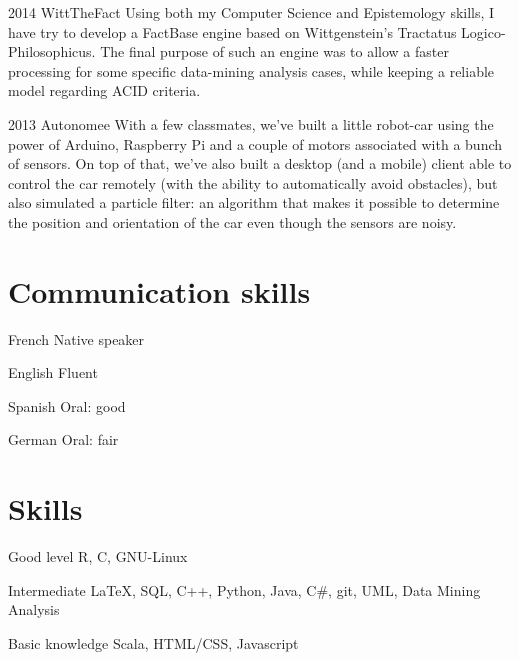 \documentclass[fontsize=10pt]{tccv}
\begin{document}
\begin{list}

\item{2014}
     {WittTheFact}
     {Using both my Computer Science and Epistemology skills, I have try to develop a
     FactBase engine based on Wittgenstein’s Tractatus Logico-Philosophicus.
     The final purpose of such an engine was to allow a faster processing for some specific data-mining analysis cases, while keeping a reliable model regarding ACID criteria.}

\item{2013}
     {Autonomee}
     {With a few classmates, we've built a little robot-car using the power of Arduino, Raspberry Pi and a couple of motors associated with a bunch of sensors. On top of that, we've also built a desktop (and a mobile) client able to control the car remotely (with the ability to automatically avoid obstacles), but also simulated a particle filter: an algorithm that makes it possible to determine the position and orientation of the car even though the sensors are noisy.}

\end{list}

\section{Communication skills}

\begin{factlist}
\item{French}
     {Native speaker}
\item{English}
     {Fluent}
\item{Spanish}
     {Oral: good}
\item{German}
     {Oral: fair}
\end{factlist}

\section{Skills}

\begin{factlist}

\item{Good level}
     {R, C, GNU-Linux}

\item{Intermediate}
     {\LaTeX, SQL, C++, Python, Java, C\#, git, UML, Data Mining Analysis}

\item{Basic knowledge}
     {Scala, HTML/CSS, Javascript}

\end{factlist}
\end{document}
